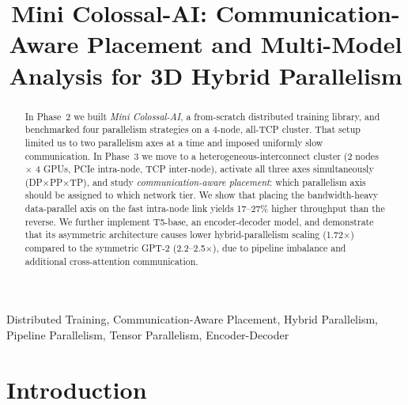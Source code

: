 \documentclass[conference]{IEEEtran}
\begin{document}
\title{Mini Colossal-AI: Communication-Aware Placement and Multi-Model Analysis for 3D Hybrid Parallelism\\}

\author{
\and
{}
\and
{}
\and
{}
}

\maketitle

\begin{abstract}
In Phase~2 we built \textit{Mini Colossal-AI}, a from-scratch distributed training library, and benchmarked four parallelism strategies on a 4-node, all-TCP cluster. That setup limited us to two parallelism axes at a time and imposed uniformly slow communication. In Phase~3 we move to a heterogeneous-interconnect cluster (2 nodes $\times$ 4 GPUs, PCIe intra-node, TCP inter-node), activate all three axes simultaneously (DP$\times$PP$\times$TP), and study \textit{communication-aware placement}: which parallelism axis should be assigned to which network tier. We show that placing the bandwidth-heavy data-parallel axis on the fast intra-node link yields 17--27\% higher throughput than the reverse. We further implement T5-base, an encoder-decoder model, and demonstrate that its asymmetric architecture causes lower hybrid-parallelism scaling (1.72$\times$) compared to the symmetric GPT-2 (2.2--2.5$\times$), due to pipeline imbalance and additional cross-attention communication.
\end{abstract}

\begin{IEEEkeywords}
Distributed Training, Communication-Aware Placement, Hybrid Parallelism, Pipeline Parallelism, Tensor Parallelism, Encoder-Decoder
\end{IEEEkeywords}

\section{Introduction}
\end{document}

